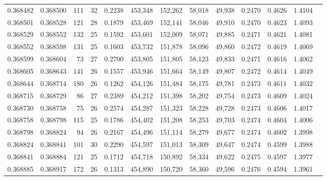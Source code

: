 \begin{tabular}{rrrrrrrrrrrrr}
0.368482 & 0.368500 &   111 &  32 &                                     0.2238 & 453,348 & 152,262 &  58,018 &  49,938 & 0.2470 & 0.4626 & 1.4104 \\
0.368501 & 0.368528 &   121 &  28 &                                     0.1879 & 453,469 & 152,141 &  58,046 &  49,910 & 0.2470 & 0.4623 & 1.4093 \\
0.368529 & 0.368552 &   132 &  25 &                                     0.1592 & 453,601 & 152,009 &  58,071 &  49,885 & 0.2471 & 0.4621 & 1.4081 \\
0.368552 & 0.368598 &   131 &  25 &                                     0.1603 & 453,732 & 151,878 &  58,096 &  49,860 & 0.2472 & 0.4619 & 1.4069 \\
0.368599 & 0.368604 &    73 &  27 &                                     0.2700 & 453,805 & 151,805 &  58,123 &  49,833 & 0.2471 & 0.4616 & 1.4062 \\
0.368605 & 0.368643 &   141 &  26 &                                     0.1557 & 453,946 & 151,664 &  58,149 &  49,807 & 0.2472 & 0.4614 & 1.4049 \\
0.368644 & 0.368714 &   180 &  26 &                                     0.1262 & 454,126 & 151,484 &  58,175 &  49,781 & 0.2473 & 0.4611 & 1.4032 \\
0.368715 & 0.368729 &    86 &  27 &                                     0.2389 & 454,212 & 151,398 &  58,202 &  49,754 & 0.2473 & 0.4609 & 1.4024 \\
0.368730 & 0.368758 &    75 &  26 &                                     0.2574 & 454,287 & 151,323 &  58,228 &  49,728 & 0.2473 & 0.4606 & 1.4017 \\
0.368758 & 0.368798 &   115 &  25 &                                     0.1786 & 454,402 & 151,208 &  58,253 &  49,703 & 0.2474 & 0.4604 & 1.4006 \\
0.368798 & 0.368824 &    94 &  26 &                                     0.2167 & 454,496 & 151,114 &  58,279 &  49,677 & 0.2474 & 0.4602 & 1.3998 \\
0.368824 & 0.368841 &   101 &  30 &                                     0.2290 & 454,597 & 151,013 &  58,309 &  49,647 & 0.2474 & 0.4599 & 1.3988 \\
0.368841 & 0.368884 &   121 &  25 &                                     0.1712 & 454,718 & 150,892 &  58,334 &  49,622 & 0.2475 & 0.4597 & 1.3977 \\
0.368885 & 0.368917 &   172 &  26 &                                     0.1313 & 454,890 & 150,720 &  58,360 &  49,596 & 0.2476 & 0.4594 & 1.3961 \\

\end{tabular}
